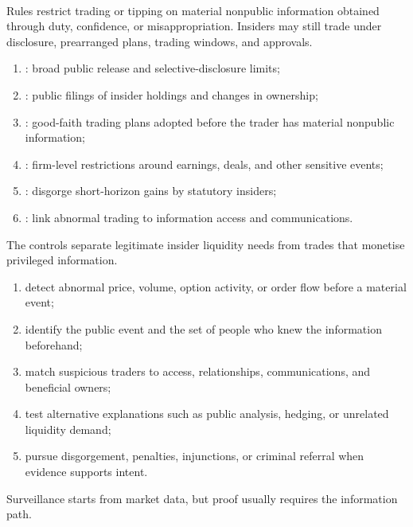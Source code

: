 \begin{marketrule} \\
Rules restrict trading or tipping on material nonpublic information obtained through duty, confidence, or misappropriation. Insiders may still trade under disclosure, prearranged plans, trading windows, and approvals.
\end{marketrule}

\begin{taxonomy} 
\begin{enumerate}[label=\roman*.]
\setlength{\itemsep}{0pt}
\item {}: broad public release and selective-disclosure limits;
\item {}: public filings of insider holdings and changes in ownership;
\item {}: good-faith trading plans adopted before the trader has material nonpublic information;
\item {}: firm-level restrictions around earnings, deals, and other sensitive events;
\item {}: disgorge short-horizon gains by statutory insiders;
\item {}: link abnormal trading to information access and communications.
\end{enumerate}
The controls separate legitimate insider liquidity needs from trades that monetise privileged information.
\end{taxonomy}

\begin{process} 
\begin{enumerate}[label=\roman*.]
\setlength{\itemsep}{0pt}
\item detect abnormal price, volume, option activity, or order flow before a material event;
\item identify the public event and the set of people who knew the information beforehand;
\item match suspicious traders to access, relationships, communications, and beneficial owners;
\item test alternative explanations such as public analysis, hedging, or unrelated liquidity demand;
\item pursue disgorgement, penalties, injunctions, or criminal referral when evidence supports intent.
\end{enumerate}
Surveillance starts from market data, but proof usually requires the information path.
\end{process}


